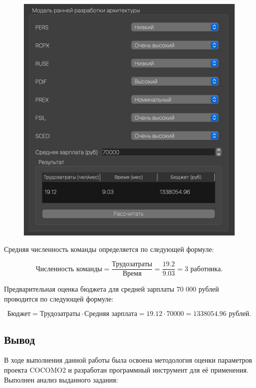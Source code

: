 \begin{figure}[h!]
	\begin{center}
		\includegraphics[scale=0.4]{inc/img/p_3.jpg}
	\end{center}
	\captionsetup{justification=centering}
	\label{fig:u3}
\end{figure}

Средняя численность команды определяется по следующей формуле:

$$\text{Численность команды} = \frac{\text{Трудозатраты}}{\text{Время}} = \frac{19.2}{9.03} = 3 \text{ работника.}$$

Предварительная оценка бюджета для средней зарплаты 70 000 рублей проводится по следующей формуле:

$$\text{Бюджет} = \text{Трудозатраты} \cdot \text{Средняя зарплата} = 19.12 \cdot 70 000 = 1 338 054.96 \text{ рублей.}$$

\subsection*{Вывод}

В ходе выполнения данной работы была освоена методология оценки
параметров проекта COCOMO2 и разработан программный инструмент для её
применения. Выполнен анализ выданного задания:

